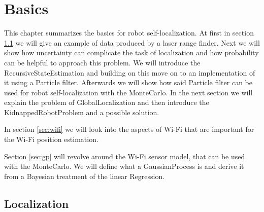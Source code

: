 \chapter{Basics} %
\label{Chapter2}
This chapter summarizes the basics for robot self-localization. At first in section \ref{sec:localization} we will give an example of data produced by a laser range finder. Next we will show how uncertainty can complicate the task of localization and how probability can be helpful to approach this problem. We will introduce the \gls{RecursiveStateEstimation} and building on this move on to an implementation of it using a \gls{Particle} filter. Afterwards we will show how said \gls{Particle} filter can be used for robot self-localization with the \Gls{MonteCarlo}. In the next section we will explain the problem of \gls{GlobalLocalization} and then introduce the \gls{KidnappedRobotProblem} and a possible solution.

In section \ref{sec:wifi} we will look into the aspects of Wi-Fi that are important for the Wi-Fi position estimation.

Section \ref{sec:gp} will revolve around the Wi-Fi sensor model, that can be used with the \Gls{MonteCarlo}. We will define what a \Gls{GaussianProcess} is and derive it from a Bayesian treatment of the linear \gls{Regression}. 

\section{Localization} \label{sec:localization}
